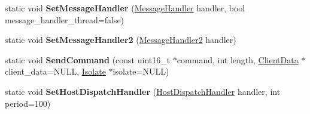 \begin{DoxyCompactItemize}
\item 
\hypertarget{classv8_1_1_debug_ab079dd46bc3989eb990c7ef40604c5a2}{}static void {\bfseries Set\+Message\+Handler} (\hyperlink{classv8_1_1_debug_aea5c8ab838a3b3c263a71828fb0767ac}{Message\+Handler} handler, bool message\+\_\+handler\+\_\+thread=false)\label{classv8_1_1_debug_ab079dd46bc3989eb990c7ef40604c5a2}

\item 
\hypertarget{classv8_1_1_debug_a0375563b2a1e0b4ea5f70a742209bb3f}{}static void {\bfseries Set\+Message\+Handler2} (\hyperlink{classv8_1_1_debug_a0fb8f7e1f8fa47cb23f7ad72cd533c77}{Message\+Handler2} handler)\label{classv8_1_1_debug_a0375563b2a1e0b4ea5f70a742209bb3f}

\item 
\hypertarget{classv8_1_1_debug_a3fe024335cf785f8df1f072a9aea3555}{}static void {\bfseries Send\+Command} (const uint16\+\_\+t $\ast$command, int length, \hyperlink{classv8_1_1_debug_1_1_client_data}{Client\+Data} $\ast$client\+\_\+data=N\+U\+L\+L, \hyperlink{classv8_1_1_isolate}{Isolate} $\ast$isolate=N\+U\+L\+L)\label{classv8_1_1_debug_a3fe024335cf785f8df1f072a9aea3555}

\item 
\hypertarget{classv8_1_1_debug_aa55c29d5cc7b04c4fc24cd89c77f3f54}{}static void {\bfseries Set\+Host\+Dispatch\+Handler} (\hyperlink{classv8_1_1_debug_a442f686afe7d80928b57b3ff8ac3f6e7}{Host\+Dispatch\+Handler} handler, int period=100)\label{classv8_1_1_debug_aa55c29d5cc7b04c4fc24cd89c77f3f54}


\end{DoxyCompactItemize}
